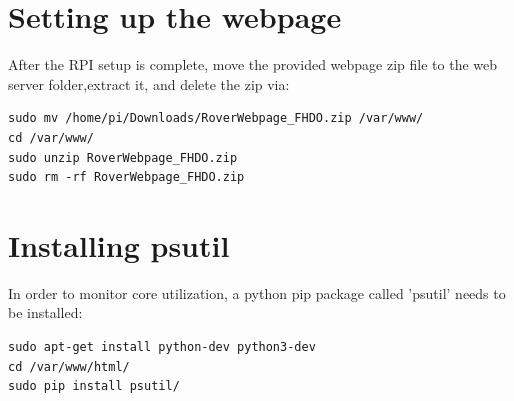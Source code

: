 \section{Setting up the webpage}
After the RPI setup is complete, move the provided webpage zip file to the web server folder,extract it, and delete the zip via:
\begin{lstlisting}
sudo mv /home/pi/Downloads/RoverWebpage_FHDO.zip /var/www/
cd /var/www/ 
sudo unzip RoverWebpage_FHDO.zip
sudo rm -rf RoverWebpage_FHDO.zip
\end{lstlisting}
\section{Installing psutil}
In order to monitor core utilization, a python pip package called 'psutil' needs to be installed:
\begin{lstlisting}
sudo apt-get install python-dev python3-dev
cd /var/www/html/
sudo pip install psutil/
\end{lstlisting}
